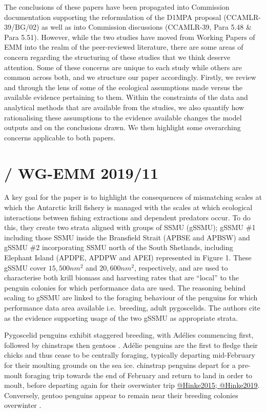 \documentclass[]{elsarticle} %
\begin{document}
The conclusions of these papers have been propagated into Commission
documentation supporting the reformulation of the D1MPA proposal
(CCAMLR-39/BG/02) as well as into Commission discussions (CCAMLR-39,
Para 5.48 \& Para 5.51). However, while the two studies have moved from
Working Papers of EMM into the realm of the peer-reviewed literature,
there are some areas of concern regarding the structuring of these
studies that we think deserve attention. Some of these concerns are
unique to each study while others are common across both, and we
structure our paper accordingly. Firstly, we review \citet{Watters2020}
and \citet{Kruger2021} through the lens of some of the ecological
assumptions made versus the available evidence pertaining to them.
Within the constraints of the data and analytical methods that are
available from the studies, we also quantify how rationalising these
assumptions to the evidence available changes the model outputs and on
the conclusions drawn. We then highlight some overarching concerns
applicable to both papers.

\section{\texorpdfstring{\citet{Watters2020} / WG-EMM
2019/11}{@Watters2020 / WG-EMM 2019/11}}\label{watters2020-wg-emm-201911}

A key goal for the paper is to highlight the consequences of mismatching
scales at which the Antarctic krill fishery is managed with the scales
at which ecological interactions between fishing extractions and
dependent predators occur. To do this, they create two strata aligned
with groups of SSMU (gSSMU); gSSMU \#1 including those SSMU inside the
Bransfield Strait (APBSE and APBSW) and gSSMU \#2 incorporating SSMU
north of the South Shetlands, including Elephant Island (APDPE, APDPW
and APEI) represented in Figure 1. These gSSMU cover \(15,500nm^2\) and
\(20,600nm^2\), respectively, and are used to characterise both krill
biomass and harvesting rates that are ``local'' to the penguin colonies
for which performance data are used. The reasoning behind scaling to
gSSMU are linked to the foraging behaviour of the penguins for which
performance data area available i.e.~breeding, adult pygoscelids. The
authors cite \citet{Hinke2017} as the evidence supporting usage of the
two gSSMU as appropriate strata.

Pygoscelid penguins exhibit staggered breeding, with Adélies commencing
first, followed by chinstraps then gentoos \citep{Black2016}. Adélie
penguins are the first to fledge their chicks and thus cease to be
centrally foraging, typically departing mid-February for their moulting
grounds on the sea ice. chinstrap penguins depart for a pre-moult
foraging trip towards the end of February and return to land in order to
moult, before departing again for their overwinter trip
\href{Figure\%202}{@Hinke2015; @Hinke2019}. Conversely, gentoo penguins
appear to remain near their breeding colonies overwinter
\citep{korczak-abshireCoastalRegionsNorthern2021}.
\end{document}
